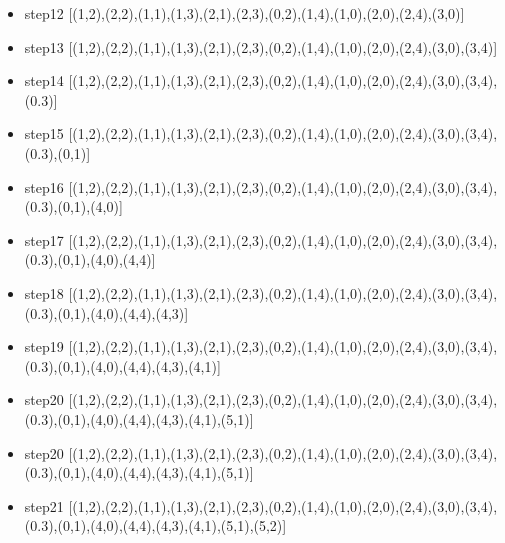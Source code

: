 \documentclass[aps,letterpaper,10pt]{revtex4}
\begin{document}
\begin{itemize}
[(6.82,(3,4)),(6.82,(3,0)),(8.38,(0,0)),(8.38,(0,4)),(7.09,(0,3)),(7.09,(0,1))]
\item step12 [(1,2),(2,2),(1,1),(1,3),(2,1),(2,3),(0,2),(1,4),(1,0),(2,0),(2,4),(3,0)]\newline
[(7.23,(4,0)),(6.82,(3,4)),(8.38,(0,0)),(8.38,(0,4)),(7.09,(0,3)),(7.09,(0,1))]
\item step13
[(1,2),(2,2),(1,1),(1,3),(2,1),(2,3),(0,2),(1,4),(1,0),(2,0),(2,4),(3,0),(3,4)]\newline
[(7.23,(4,4),(7.23,(4,0)),(8.38,(0,0)),(8.38,(0,4)),(7.09,(0,3)),(7.09,(0,1))]
\item step14
[(1,2),(2,2),(1,1),(1,3),(2,1),(2,3),(0,2),(1,4),(1,0),(2,0),(2,4),(3,0),(3,4),(0.3)]\newline
[(7.23,(4,4),(7.23,(4,0)),(8.38,(0,0)),(8.38,(0,4)),(7.09,(0,1))]
\item step15
[(1,2),(2,2),(1,1),(1,3),(2,1),(2,3),(0,2),(1,4),(1,0),(2,0),(2,4),(3,0),(3,4),(0.3),(0,1)]\newline
[(7.23,(4,4),(7.23,(4,0)),(8.38,(0,0)),(8.38,(0,4))]
\item step16
[(1,2),(2,2),(1,1),(1,3),(2,1),(2,3),(0,2),(1,4),(1,0),(2,0),(2,4),(3,0),(3,4),(0.3),(0,1),(4,0)]\newline
[(7.41,(4,1)),(8,(5,0)),(7.23,(4,4),(8.38,(0,0)),(8.38,(0,4))]
\item step17
[(1,2),(2,2),(1,1),(1,3),(2,1),(2,3),(0,2),(1,4),(1,0),(2,0),(2,4),(3,0),(3,4),(0.3),(0,1),(4,0),(4,4)]\newline
[(7.41,(4,3)),(8,(5,4)),(7.41,(4,1)),(8,(5,0)),(8.38,(0,0)),(8.38,(0,4))]
\item step18
[(1,2),(2,2),(1,1),(1,3),(2,1),(2,3),(0,2),(1,4),(1,0),(2,0),(2,4),(3,0),(3,4),(0.3),(0,1),(4,0),(4,4),(4,3)]\newline
[(8,(4,2))(8,(5,3)),(8,(5,4)),(7.41,(4,1)),(8,(5,0)),(8.38,(0,0)),(8.38,(0,4))]
\item step19
[(1,2),(2,2),(1,1),(1,3),(2,1),(2,3),(0,2),(1,4),(1,0),(2,0),(2,4),(3,0),(3,4),(0.3),(0,1),(4,0),(4,4),(4,3),(4,1)]\newline
[(8,(5,1)),(8,(4,2)),(8,(5,3)),(8,(5,4)),(8,(5,0)),(8.38,(0,0)),(8.38,(0,4))]
\item step20
[(1,2),(2,2),(1,1),(1,3),(2,1),(2,3),(0,2),(1,4),(1,0),(2,0),(2,4),(3,0),(3,4),(0.3),(0,1),(4,0),(4,4),(4,3),(4,1),(5,1)]\newline
[(8,(5,2)),(8,(4,2)),(8,(5,3)),(8,(5,4)),(8,(5,0)),(8.38,(0,0)),(8.38,(0,4))]
\item step20
[(1,2),(2,2),(1,1),(1,3),(2,1),(2,3),(0,2),(1,4),(1,0),(2,0),(2,4),(3,0),(3,4),(0.3),(0,1),(4,0),(4,4),(4,3),(4,1),(5,1)]\newline
[(9.41,(6,1)),(8,(5,2)),(8,(4,2)),(8,(5,3)),(8,(5,4)),(8,(5,0)),(8.38,(0,0)),(8.38,(0,4))]
\item step21
[(1,2),(2,2),(1,1),(1,3),(2,1),(2,3),(0,2),(1,4),(1,0),(2,0),(2,4),(3,0),(3,4),(0.3),(0,1),(4,0),(4,4),(4,3),(4,1),(5,1),(5,2)]\newline
[(9.41,(6,1)),(8,(4,2)),(8,(5,3)),(8,(5,4)),(8,(5,0)),(8.38,(0,0)),(8.38,(0,4))]
\end{itemize}
\end{document}
